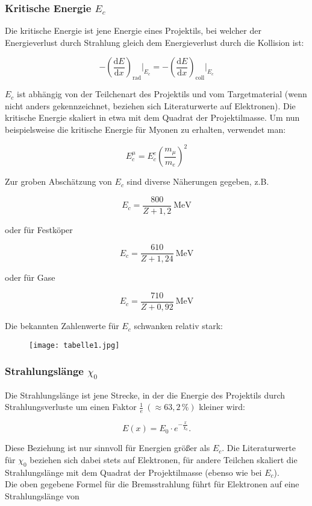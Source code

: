 \subsubsection*{Kritische Energie $E_c$}

Die kritische Energie ist jene Energie eines Projektils, bei welcher der Energieverlust durch
Strahlung gleich dem Energieverlust durch die Kollision ist:

\[-\left(\frac{\mathrm{d}E}{\mathrm{d}x}\right)_{\text{rad}} \bigg|_{E_c} = -\left(\frac{\mathrm{d}E}{\mathrm{d}x}\right)_{\text{coll}}
\bigg|_{E_c}  \]

$E_c$ ist abhängig von der Teilchenart des Projektils und vom Targetmaterial (wenn nicht anders
gekennzeichnet, beziehen sich Literaturwerte auf Elektronen). Die kritische Energie skaliert in etwa
mit dem Quadrat der Projektilmasse. Um nun beispielsweise die kritische Energie für Myonen zu
erhalten, verwendet man:

\[E_c^\mu = E_c^e \left( \frac{m_\mu}{m_e} \right)^2 \]

Zur groben Abschätzung von $E_c$ sind diverse Näherungen gegeben, z.B.

\[E_c = \frac{800}{Z+1{,}2}~\text{MeV} \]

oder für Festköper

\[E_c = \frac{610}{Z+1{,}24}~\text{MeV} \]

oder für Gase

\[E_c = \frac{710}{Z+0{,}92}~\text{MeV} \]


Die bekannten Zahlenwerte für $E_c$ schwanken relativ stark:

\begin{figure}[H]
	\centering
	\texttt{[image: tabelle1.jpg]}
\end{figure}

\subsubsection*{Strahlungslänge $\chi_0$}

Die Strahlungslänge ist jene Strecke, in der die Energie des Projektils durch Strahlungsverluste um
einen Faktor $\frac{1}{e}~(\approx63{,}2\,\%)$ kleiner wird:

\[E(x)=E_0\cdot e^{-\frac{x}{\chi_0}}.\]

Diese Beziehung ist nur sinnvoll für Energien größer als $E_c$. Die Literaturwerte für $\chi_0$
beziehen sich dabei stets auf Elektronen, für andere Teilchen skaliert die Strahlungslänge mit dem
Quadrat der Projektilmasse (ebenso wie bei $E_c$).
\\
Die oben gegebene Formel für die Bremsstrahlung führt für Elektronen auf eine Strahlungslänge
von 

